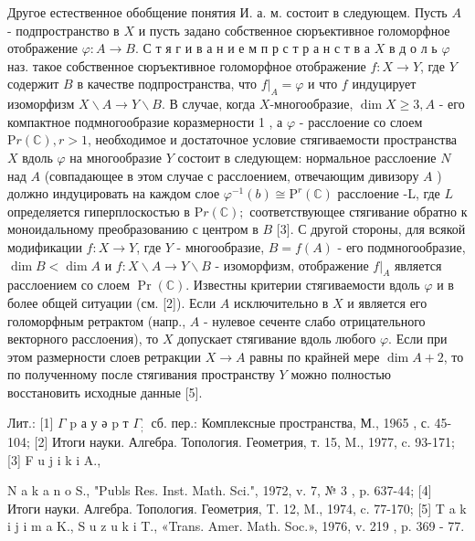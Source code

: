 \documentclass[10pt]{article}
\begin{document}
Другое естественное обобщение понятия И. а. м. состоит в следующем. Пусть $A$ - подпространство в $X$ и пусть задано собственное сюръективное голоморфное отображение $\varphi: A \rightarrow B$. С т я г и в а н и е м п р с т р а н с т в а $X$ в д о л ь $\varphi$ наз. такое собственное сюръективное голоморфное отображение $f: X \rightarrow Y$, где $Y$ содержит $B$ в качестве подпространства, что $\left.f\right|_{A}=\varphi$ и что $f$ индуцирует изоморфизм $X \backslash A \rightarrow Y \backslash B$. В случае, когда $X$-многообразие, $\operatorname{dim} X \geqslant 3, A$ - его компактное подмногообразие коразмерности 1 , а $\varphi$ - расслоение со слоем $\mathrm{P} r(\mathbb{C}), r>1$, необходимое и достаточное условие стягиваемости пространства $X$ вдоль $\varphi$ на многообразие $Y$ состоит в следующем: нормальное расслоение $N$ над $A$ (совпадающее в этом случае с расслоением, отвечающим дивизору $A$ ) должно индуцировать на каждом слое $\varphi^{-1}(b) \cong \mathrm{P}^{r}(\mathbb{C})$ расслоение -L, где $L$ определяется гиперплоскостью в $\mathrm{P} r(\mathbb{C}) ;$ соответствующее стягивание обратно к моноидальному преобразованию с центром в $B$ [3]. С другой стороны, для всякой модификации $f: X \rightarrow Y$, где $Y$ - многообразие, $B=f(A)$ - его подмногообразие, $\operatorname{dim} B<\operatorname{dim} A$ и $f: X \backslash A \rightarrow Y \backslash B$ - изоморфизм, отображение $\left.f\right|_{A}$ является расслоением со слоем $\operatorname{Pr}(\mathbb{C})$. Известны критерии стягиваемости вдоль $\varphi$ и в более общей ситуации (см. [2]). Если $A$ исключительно в $X$ и является его голоморфным ретрактом (напр., $A$ - нулевое сеченте слабо отрицательного векторного расслоения), то $X$ допускает стягивание вдоль любого $\varphi$. Если при этом размерности слоев ретракции $X \rightarrow A$ равны по крайней мере $\operatorname{dim} A+2$, то по полученному после стягивания пространству $Y$ можно полностью восстановить исходные данные [5].



Лит.: [1] $\Gamma$ p а у ә p т $\Gamma_{\text {; }}$ сб. пер.: Комплексные пространства, М., 1965 , с. 45-104; [2] Итоги науки. Алгебра. Топология. Геометрия, т. 15, M., 1977, c. 93-171; [3] F u j i k i A.,

$\mathrm{N}$ a k a n o S., "Publs Res. Inst. Math. Sci.", 1972, v. 7, № 3 , p. 637-44; [4] Итоги науки. Алгебра. Топология. Геометрия, T. 12, M., 1974, c. 77-170; [5] T a k i j i m a K., S u z u k i T., «Trans. Amer. Math. Soc.», 1976, v. 219 , p. 369 - 77.
\end{document}

